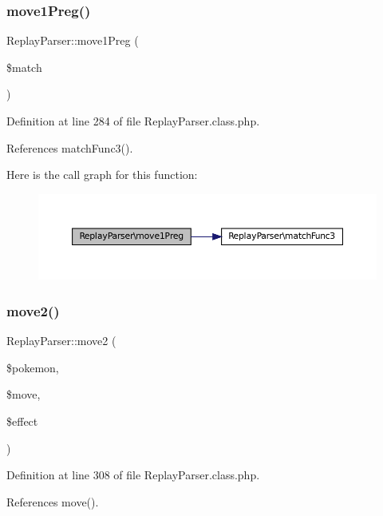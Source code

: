 \subsubsection{\texorpdfstring{move1\+Preg()}{move1Preg()}}
{\footnotesize\ttfamily Replay\+Parser\+::move1\+Preg (\begin{DoxyParamCaption}\item[{}]{\$match }\end{DoxyParamCaption})}



Definition at line 284 of file Replay\+Parser.\+class.\+php.



References match\+Func3().

Here is the call graph for this function\+:\nopagebreak
\begin{figure}[H]
\begin{center}
\leavevmode
\includegraphics[width=350pt]{class_replay_parser_a85c7106777dea6a2770e60ba29b7d467_cgraph}
\end{center}
\end{figure}
\mbox{\label{class_replay_parser_a661a82797d10dec898444269835968a8}} 
\subsubsection{\texorpdfstring{move2()}{move2()}}
{\footnotesize\ttfamily Replay\+Parser\+::move2 (\begin{DoxyParamCaption}\item[{}]{\$pokemon,  }\item[{}]{\$move,  }\item[{}]{\$effect }\end{DoxyParamCaption})}



Definition at line 308 of file Replay\+Parser.\+class.\+php.



References move().

